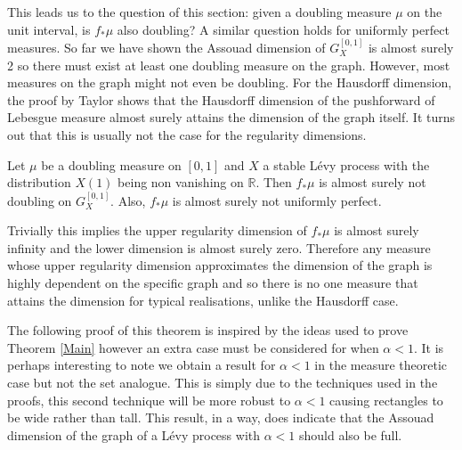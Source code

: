 This leads us to the question of this section: given a doubling measure $\mu$ on the unit interval, is $f_*\mu$ also doubling? A similar question holds for uniformly perfect measures. So far we have shown the Assouad dimension of $G_X^{[0,1]}$ is almost surely 2 so there must exist at least one doubling measure on the graph. However, most measures on the graph might not even be doubling. For the Hausdorff dimension, the proof by Taylor shows that the Hausdorff dimension of the pushforward of Lebesgue measure almost surely attains the dimension of the graph itself. It turns out that this is usually not the case for the regularity dimensions.

\begin{theorem}\label{brownianthm}
	Let $\mu$ be a doubling measure on $[0,1]$ and $X$ a stable L\'evy process with the distribution $X(1)$ being non vanishing on $\mathbb{R}$. Then $f_*\mu$ is almost surely not doubling on $G_X^{[0,1]}$. Also, $f_*\mu$ is almost surely not uniformly perfect.
\end{theorem}


Trivially this implies the upper regularity dimension of $f_*\mu$ is almost surely infinity and the lower dimension is almost surely zero. Therefore any measure whose upper regularity dimension approximates the dimension of the graph is highly dependent on the specific graph and so there is no one measure that attains the dimension for typical realisations, unlike the Hausdorff case. 

The following proof of this theorem is inspired by the ideas used to prove Theorem \ref{Main} however an extra case must be considered for when $\alpha < 1$. It is perhaps interesting to note we obtain a result for $\alpha < 1$ in the measure theoretic case but not the set analogue. This is simply due to the techniques used in the proofs, this second technique will be more robust to $\alpha < 1$ causing rectangles to be wide rather than tall. This result, in a way, does indicate that the Assouad dimension of the graph of a L\'evy process with $\alpha < 1$ should also be full.


